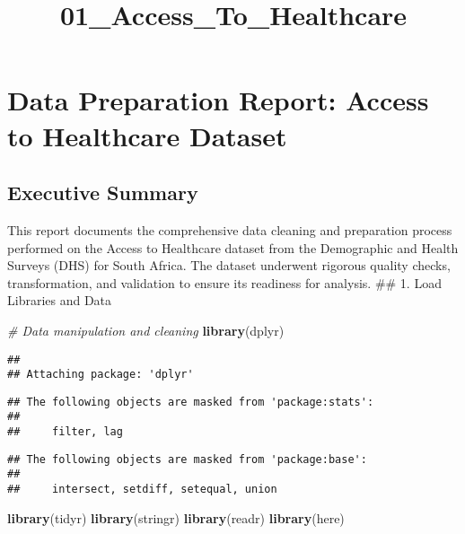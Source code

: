 \documentclass[
]{article}
\title{01\_Access\_To\_Healthcare}
\author{}
\date{\vspace{-2.5em}}
\newenvironment{Shaded}{\begin{snugshade}}{\end{snugshade}}
\newcommand{\CommentTok}[1]{\textcolor[rgb]{0.56,0.35,0.01}{\textit{#1}}}
\newcommand{\FunctionTok}[1]{\textcolor[rgb]{0.13,0.29,0.53}{\textbf{#1}}}
\newcommand{\NormalTok}[1]{#1}
\begin{document}
\maketitle

\section{Data Preparation Report: Access to Healthcare
Dataset}\label{data-preparation-report-access-to-healthcare-dataset}

\subsection{Executive Summary}\label{executive-summary}

This report documents the comprehensive data cleaning and preparation
process performed on the Access to Healthcare dataset from the
Demographic and Health Surveys (DHS) for South Africa. The dataset
underwent rigorous quality checks, transformation, and validation to
ensure its readiness for analysis. \#\# 1. Load Libraries and Data

\begin{Shaded}
\begin{Highlighting}[]
\CommentTok{\# Data manipulation and cleaning}
\FunctionTok{library}\NormalTok{(dplyr)}
\end{Highlighting}
\end{Shaded}

\begin{verbatim}
## 
## Attaching package: 'dplyr'
\end{verbatim}

\begin{verbatim}
## The following objects are masked from 'package:stats':
## 
##     filter, lag
\end{verbatim}

\begin{verbatim}
## The following objects are masked from 'package:base':
## 
##     intersect, setdiff, setequal, union
\end{verbatim}

\begin{Shaded}
\begin{Highlighting}[]
\FunctionTok{library}\NormalTok{(tidyr)}
\FunctionTok{library}\NormalTok{(stringr)}
\FunctionTok{library}\NormalTok{(readr)}
\FunctionTok{library}\NormalTok{(here)}
\end{Highlighting}
\end{Shaded}
\end{document}
